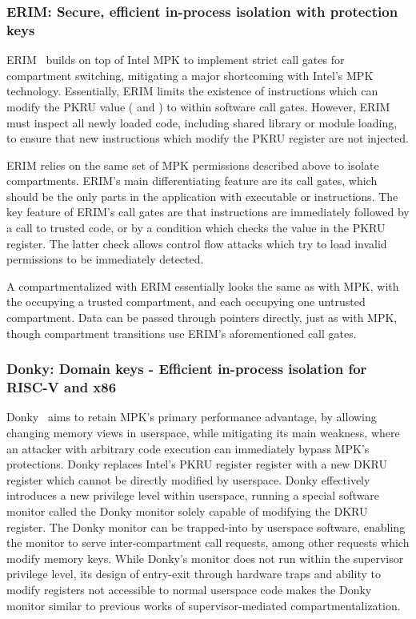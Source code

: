 \subsubsection{ERIM: Secure, efficient in-process isolation with protection keys}
ERIM~\cite{ERIMOberwagner19} builds on top of Intel MPK to implement 
strict call gates for compartment switching, mitigating a major
shortcoming with Intel's MPK technology.
Essentially, ERIM limits the existence of instructions which can
modify the PKRU value ( and ) to within
software call gates.
However, ERIM must inspect all newly loaded code, including shared
library or module loading, to ensure that new instructions which
modify the PKRU register are not injected.

ERIM relies on the same set of MPK permissions described above to
isolate compartments.
ERIM's main differentiating feature are its call gates, which should
be the only parts in the application with executable  or
 instructions.
The key feature of ERIM's call gates are that  instructions
are immediately followed by a call to trusted code, or by a condition which
checks the value in the PKRU register. 
The latter check allows control flow attacks which try to load invalid
permissions to be immediately detected.

A \browser compartmentalized with ERIM essentially looks the same as with
MPK, with the \renderer occupying a trusted compartment, and each \sandbox
occupying one untrusted compartment. 
Data can be passed through pointers directly, just as with MPK, though 
compartment transitions use ERIM's aforementioned call gates.

\subsubsection{Donky: Domain keys - Efficient in-process isolation for RISC-V and x86}
Donky~\cite{SchrammelWSS0MG20Donky} aims to retain MPK's primary 
performance advantage, by allowing changing memory views in userspace, 
while mitigating its main weakness, 
where an attacker with arbitrary code execution can immediately bypass
MPK's protections.
Donky replaces Intel's PKRU register register with a new DKRU register
which cannot be directly modified by userspace.
Donky effectively introduces a new privilege level within userspace, 
running a special software monitor called the Donky monitor solely 
capable of modifying the DKRU register.
The Donky monitor can be trapped-into by userspace software, enabling the
monitor to serve inter-compartment call requests, among other requests
which modify memory keys.
While Donky's monitor does not run within the supervisor privilege level,
its design of entry-exit through hardware traps and ability to modify
registers not accessible to normal userspace code makes the Donky monitor
similar to previous works of supervisor-mediated compartmentalization.

